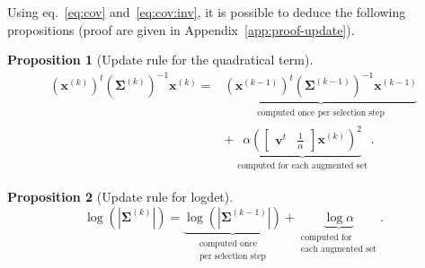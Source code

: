 \documentclass[journal]{IEEEtran}
\newtheorem{prop}{Proposition}
\begin{document}

        Using eq.~\ref{eq:cov} and~\ref{eq:cov:inv}, it is possible to
        deduce  the   following  propositions  (proof  are   given  in
        Appendix~\ref{app:proof-update}).
        \begin{prop}[Update rule for the quadratical term]
        \label{eq:update-quad}
            \begin{align}
              (\mathbf{x}^{(k)})^t (\boldsymbol{\Sigma}^{(k)})^{-1} \mathbf{x}^{(k)} = &\underbrace{(\mathbf{x}^{(k-1)})^t (\boldsymbol{\Sigma}^{(k-1)})^{-1} \mathbf{x}^{(k-1)}}_{\substack{\text{computed once per selection step}}} \nonumber \\
                                                                                       &+ \underbrace{\alpha ( \left[\begin{array}{cc} \mathbf{v}^t & \frac{1}{\alpha} \end{array}\right] \mathbf{x}^{(k)} )^2}_{\substack{\text{computed for each augmented set}}}.
            \end{align}
        \end{prop}
        \begin{prop}[Update rule for logdet]
        \label{eq:update-log}
            \begin{equation}
                \log \left(|\boldsymbol{\Sigma}^{(k)}|\right) = \underbrace{\log \left(|\boldsymbol{\Sigma}^{(k-1)}|\right)}_{\substack{\text{computed once}\\ \text{per selection step}}} + \underbrace{\log \alpha}_{\substack{\text{computed for} \\ \text{each augmented set}}}.
            \end{equation}
        \end{prop}
\end{document}
